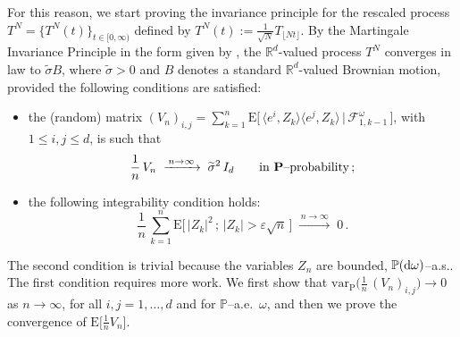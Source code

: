 \documentclass[a4paper,reqno,11pt]{amsart}
\numberwithin{equation}{section}
\newcommand{\bbP}{{\ensuremath{\mathbb P}} }
\newcommand{\cF}{{\ensuremath{\mathcal F}} }
\newcommand{\gs}{\sigma}
\newcommand{\go}{\omega}
\renewcommand{\tilde}{\widetilde}          %
\newcommand{\dd}{\text{\rm d}}             %
\newcommand{\R}{\mathbb{R}}
\def\bP{\ensuremath{\bs{\mathrm{P}}}}
\def\bE{\ensuremath{\bs{\mathrm{E}}}}
\def\bs{\boldsymbol}
\begin{document}
For this reason, we start proving the invariance principle for the
rescaled process $T^N = \{T^N(t)\}_{t \in [0,\infty)}$
defined by $T^N(t) := \frac{1}{\sqrt N} T_{\lfloor Nt \rfloor}$.
By the Martingale Invariance Principle 
in the form given by \cite[Corollary~3.24, Ch.~VIII]{cf:JS},
the $\R^d$-valued process $T^N$ converges in law to $\tilde \gs B$,
where $\tilde \gs > 0$ and $B$ denotes a standard $\R^d$-valued Brownian motion,
provided the following conditions are satisfied:
\begin{itemize}
\item[(i)] the (random) matrix 
$(V_n)_{i,j} = \sum_{k=1}^n \bE \big[\, \langle e^i,Z_k\rangle \langle e^j, Z_k\rangle \,\big|
\,\cF_{1,k-1}^\go \,\big]$, with $1 \le i,j \le d$, is such that
\begin{equation}
\label{eq:cond1}
\frac 1n \, V_n \;\xrightarrow{\,n\to\infty\,}\; \tilde \sigma^2\, I_d \qquad 
\text{in $\bP$--probability\,;}
\end{equation}
\item[(ii)] the following integrability condition holds:
\begin{equation}
\label{eq:cond2}
\frac 1n \, \sum_{k=1}^n \bE\big[ \, |Z_k|^2 \,;\, |Z_k| > \varepsilon \sqrt{n} \, \big]
\;\xrightarrow{\,n\to\infty\,}\; 0 \,.
\end{equation}
\end{itemize}
The second condition is trivial because the variables $Z_n$ are bounded,
$\bbP(\dd\go)$--a.s.. The first condition requires more work. 
We first show that $\mathrm{var}_{\bP} \big( \frac 1n \, (V_n)_{i,j} \big) \to 0$ 
as $n \to \infty$, for all $i,j=1,\dots,d$ and for $\bbP$--a.e.~$\omega$,
and then we prove the convergence of $\bE \big[ \frac 1n V_n \big]$.
\end{document}
